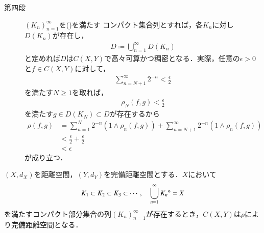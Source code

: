 \begin{prf}
\begin{description}
			\item[第四段]				
				$(K_n)_{n=1}^\infty$を()を満たす
				コンパクト集合列とすれば，各$K_n$に対し$D(K_n)$が存在し，
				\begin{align}
					D \coloneqq \bigcup_{n=1}^\infty D(K_n)
				\end{align}
				と定めれば$D$は$C(X,Y)$で高々可算かつ稠密となる．実際，任意の$\epsilon > 0$と$f \in C(X,Y)$に対して，
				\begin{align}
					\sum_{n=N+1}^\infty 2^{-n} < \frac{\epsilon}{2}
				\end{align}
				を満たす$N \geq 1$を取れば，
				\begin{align}
					\rho_N(f,g) < \frac{\epsilon}{2}
				\end{align}
				を満たす$g \in D(K_N) \subset D$が存在するから
				\begin{align}
					\rho(f,g) &= \sum_{n=1}^N 2^{-n} \left( 1 \wedge \rho_n(f,g) \right)
						+ \sum_{n=N+1}^\infty 2^{-n} \left( 1 \wedge \rho_n(f,g) \right) \\
					&< \frac{\epsilon}{2} + \frac{\epsilon}{2} \\
					&< \epsilon
				\end{align}
				が成り立つ．
				\QED
		\end{description}
	\end{prf}
	
	\begin{screen}
		\begin{thm}[$C(X,Y)$の完備性]
			$(X,d_X)$を距離空間，$(Y,d_Y)$を完備距離空間とする．$X$において
			\begin{align}
				K_1 \subset K_2 \subset K_3 \subset \cdots,
				\quad \bigcup_{n=1}^\infty {\kern0ptK_n}^{\mathrm{o}} = X
				\label{eq:completeness_and_separability_of_space_of_continuous_functions_2}
			\end{align}
			を満たすコンパクト部分集合の列$(K_n)_{n=1}^\infty$が存在するとき，$C(X,Y)$は$\rho$により完備距離空間となる．
		\end{thm}
	\end{screen}
	
